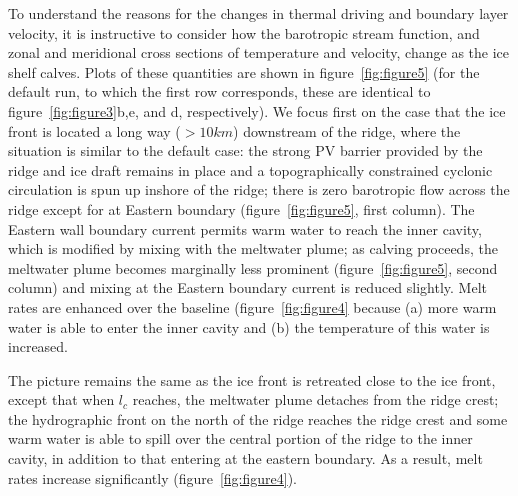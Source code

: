 \documentclass[draft]{agujournal2019}
\begin{document}
To understand the reasons for the changes in thermal driving and boundary layer velocity, it is instructive to consider how the barotropic stream function, and zonal and meridional cross sections of temperature and velocity, change as the ice shelf calves. Plots of these quantities are shown in figure~\ref{fig:figure5} (for the default run, to which the first row corresponds, these are identical to figure~\ref{fig:figure3}b,e, and d, respectively). We focus first on the case that the ice front is located a long way ($ > 10km$) downstream of the ridge, where the situation is similar to the default case: the strong PV barrier provided by the ridge and ice draft remains in place and a topographically constrained cyclonic circulation is spun up inshore of the ridge; there is zero barotropic flow across the ridge except for at Eastern boundary (figure~\ref{fig:figure5}, first column). The Eastern wall boundary current permits warm water to reach the inner cavity, which is modified by mixing with the meltwater plume; as calving proceeds, the meltwater plume becomes marginally less prominent (figure~\ref{fig:figure5}, second column) and mixing at the Eastern boundary current is reduced slightly. Melt rates are enhanced over the baseline (figure~\ref{fig:figure4} because (a) more warm water is able to enter the inner cavity and (b) the temperature of this water is increased.

The picture remains the same as the ice front is retreated close to the ice front, except that when $l_c$ reaches, the meltwater plume detaches from the ridge crest; the hydrographic front on the north of the ridge reaches the ridge crest and some warm water is able to spill over the central portion of the ridge to the inner cavity, in addition to that entering at the eastern boundary. As a result, melt rates increase significantly (figure~\ref{fig:figure4}).
\end{document}
